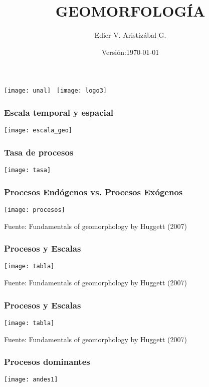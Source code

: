 \documentclass{beamer}
\title[Geomorfología Sistémica]{GEOMORFOLOGÍA}
\author[Edier Aristizábal]{Edier V. Aristizábal G.}
\institute{\url{evaristizabalg@unal.edu.co}}
\date{Versión:\today}
\begin{document}
\begin{frame}
\titlepage
\centering
	\texttt{[image: unal]}\hspace*{4.75cm}~%
   	\texttt{[image: logo3]} 
\end{frame}
\begin{frame}
\frametitle{Escala temporal y espacial}
\begin{center}
\texttt{[image: escala\_geo]}
\end{center}
\end{frame}
\begin{frame}
\frametitle{Tasa de procesos}
\begin{center}
\texttt{[image: tasa]}
\end{center}
\end{frame}
\begin{frame}
\frametitle{Procesos Endógenos vs. Procesos Exógenos}
\begin{center}
\texttt{[image: procesos]}
\end{center}
\tiny{Fuente: Fundamentals of geomorphology by Huggett (2007)
}
\end{frame}
\begin{frame}
\frametitle{Procesos y Escalas}
\begin{center}
\texttt{[image: tabla]}
\end{center}
\tiny{Fuente: Fundamentals of geomorphology by Huggett (2007)}
\end{frame}
\begin{frame}
\frametitle{Procesos y Escalas}
\begin{center}
\texttt{[image: tabla]}
\end{center}
\tiny{Fuente: Fundamentals of geomorphology by Huggett (2007)}
\end{frame}
\begin{frame}
\frametitle{Procesos dominantes}
\begin{center}
\texttt{[image: andes1]}
\end{center}
\tiny{}
\end{frame}
\end{document}
